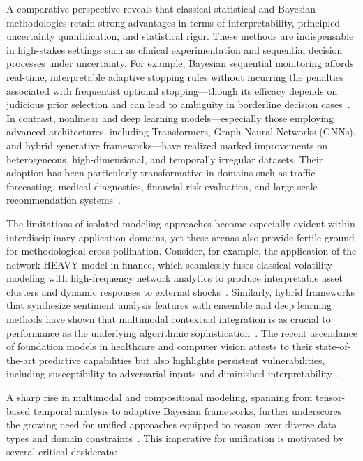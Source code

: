 \documentclass[sigconf]{acmart}
\begin{document}
A comparative perspective reveals that classical statistical and Bayesian methodologies retain strong advantages in terms of interpretability, principled uncertainty quantification, and statistical rigor. These methods are indispensable in high-stakes settings such as clinical experimentation and sequential decision processes under uncertainty. For example, Bayesian sequential monitoring affords real-time, interpretable adaptive stopping rules without incurring the penalties associated with frequentist optional stopping---though its efficacy depends on judicious prior selection and can lead to ambiguity in borderline decision cases~\cite{ref87}. In contrast, nonlinear and deep learning models—especially those employing advanced architectures, including Transformers, Graph Neural Networks (GNNs), and hybrid generative frameworks—have realized marked improvements on heterogeneous, high-dimensional, and temporally irregular datasets. Their adoption has been particularly transformative in domains such as traffic forecasting, medical diagnostics, financial risk evaluation, and large-scale recommendation systems~\cite{ref2,ref7,ref10,ref15,ref20,ref31,ref86}.

The limitations of isolated modeling approaches become especially evident within interdisciplinary application domains, yet these arenas also provide fertile ground for methodological cross-pollination. Consider, for example, the application of the network HEAVY model in finance, which seamlessly fuses classical volatility modeling with high-frequency network analytics to produce interpretable asset clusters and dynamic responses to external shocks~\cite{ref2}. Similarly, hybrid frameworks that synthesize sentiment analysis features with ensemble and deep learning methods have shown that multimodal contextual integration is as crucial to performance as the underlying algorithmic sophistication~\cite{ref8,ref14}. The recent ascendance of foundation models in healthcare and computer vision attests to their state-of-the-art predictive capabilities but also highlights persistent vulnerabilities, including susceptibility to adversarial inputs and diminished interpretability~\cite{ref61,ref65,ref86,ref83}.

A sharp rise in multimodal and compositional modeling, spanning from tensor-based temporal analysis to adaptive Bayesian frameworks, further underscores the growing need for unified approaches equipped to reason over diverse data types and domain constraints~\cite{ref46,ref51,ref69,ref70}. This imperative for unification is motivated by several critical desiderata:
\end{document}
